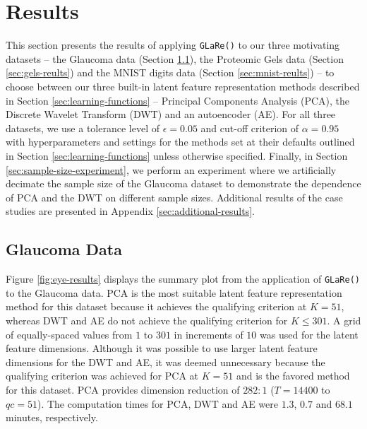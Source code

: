 \section{Results}\label{sec:results}

This section presents the results of applying \texttt{GLaRe()} to our three motivating datasets --  the Glaucoma data (Section \ref{sec:glaucoma-reults}), the Proteomic Gels data (Section \ref{sec:gels-reults}) and the MNIST digits data (Section \ref{sec:mnist-reults}) -- to choose between our three built-in latent feature representation methods described in Section \ref{sec:learning-functions} -- Principal Components Analysis (PCA), the Discrete Wavelet Transform (DWT) and an autoencoder (AE).
For all three datasets, we use a tolerance level of $\epsilon = 0.05$ and cut-off criterion of $\alpha=0.95$ with hyperparameters and settings for the methods set at their defaults outlined in Section \ref{sec:learning-functions} unless otherwise specified.
Finally, in Section \ref{sec:sample-size-experiment}, we perform an experiment where we artificially decimate the sample size of the Glaucoma dataset to demonstrate the dependence of PCA and the DWT on different sample sizes.
Additional results of the case studies are presented in Appendix \ref{sec:additional-results}.

\subsection{Glaucoma Data}\label{sec:glaucoma-reults}

Figure \ref{fig:eye-results} displays the summary plot from the application of \texttt{GLaRe()} to the Glaucoma data.
PCA is the most suitable latent feature representation method for this dataset because it achieves the qualifying criterion at $K=51$, whereas DWT and AE do not achieve the qualifying criterion for $K \leq 301$.
A grid of equally-spaced values from $1$ to $301$ in increments of $10$ was used for the latent feature dimensions.
Although it was possible to use larger latent feature dimensions for the DWT and AE, it was deemed unnecessary because the qualifying criterion was achieved for PCA at $K=51$ and is the favored method for this dataset.
PCA provides dimension reduction of $282:1$ ($T = 14400$ to $qc = 51$).
The computation times for PCA, DWT and AE were $1.3$, $0.7$ and $68.1$ minutes, respectively.



